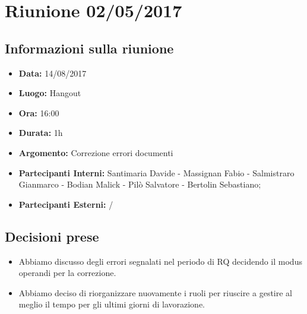 \section{Riunione 02/05/2017}
  \subsection{Informazioni sulla riunione}
    \begin{itemize}
      \item \textbf{Data: }14/08/2017
      \item \textbf{Luogo: }Hangout
      \item \textbf{Ora: }16:00
      \item \textbf{Durata: }1h
      \item \textbf{Argomento: }Correzione errori documenti
      \item \textbf{Partecipanti Interni: }Santimaria Davide - Massignan Fabio - Salmistraro Gianmarco - Bodian Malick - Pilò Salvatore - Bertolin Sebastiano;
      \item \textbf{Partecipanti Esterni: }/
    \end{itemize}
  \subsection{Decisioni prese}
		\begin{itemize}
			\item Abbiamo discusso degli errori segnalati nel periodo di RQ decidendo il modus operandi per la correzione.
      \item Abbiamo deciso di riorganizzare nuovamente i ruoli per riuscire a gestire al meglio il tempo per gli ultimi giorni di lavorazione.
		\end{itemize}
